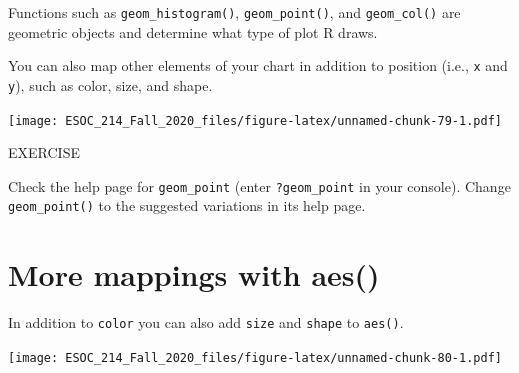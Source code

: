 \documentclass[
]{book}
\newenvironment{Shaded}{\begin{snugshade}}{\end{snugshade}}
\newcommand{\DataTypeTok}[1]{\textcolor[rgb]{0.13,0.29,0.53}{#1}}
\newcommand{\KeywordTok}[1]{\textcolor[rgb]{0.13,0.29,0.53}{\textbf{#1}}}
\newcommand{\NormalTok}[1]{#1}
\newcommand{\OperatorTok}[1]{\textcolor[rgb]{0.81,0.36,0.00}{\textbf{#1}}}
\newcommand{\StringTok}[1]{\textcolor[rgb]{0.31,0.60,0.02}{#1}}
\begin{document}
Functions such as \texttt{geom\_histogram()}, \texttt{geom\_point()}, and \texttt{geom\_col()} are geometric objects and determine what type of plot R draws.

You can also map other elements of your chart in addition to position (i.e., \texttt{x} and \texttt{y}), such as color, size, and shape.

\begin{Shaded}
\end{Shaded}

\texttt{[image: ESOC\_214\_Fall\_2020\_files/figure-latex/unnamed-chunk-79-1.pdf]}

EXERCISE

Check the help page for \texttt{geom\_point} (enter \texttt{?geom\_point} in your console).
Change \texttt{geom\_point()} to the suggested variations in its help page.

\hypertarget{more-mappings-with-aes}{%
\section{More mappings with aes()}\label{more-mappings-with-aes}}

In addition to \texttt{color} you can also add \texttt{size} and \texttt{shape} to \texttt{aes()}.

\begin{Shaded}
\end{Shaded}

\texttt{[image: ESOC\_214\_Fall\_2020\_files/figure-latex/unnamed-chunk-80-1.pdf]}
\end{document}
